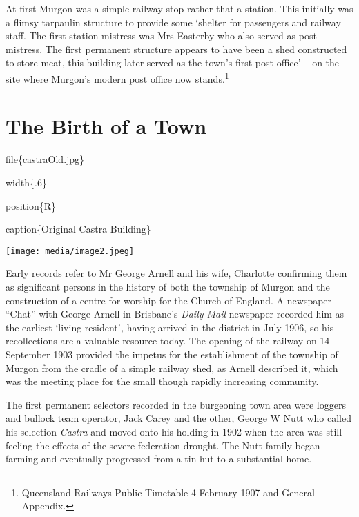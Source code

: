 At first Murgon was a simple railway stop rather that a station. This
initially was a flimsy tarpaulin structure to provide some `shelter for
passengers and railway staff. The first station mistress was Mrs
Easterby who also served as post mistress. The first permanent structure
appears to have been a shed constructed to store meat, this building
later served as the town's first post office' \emph{--} on the site
where Murgon's modern post office now stands.\footnote{Queensland
  Railways Public Timetable 4 February 1907 and General Appendix.}

\hypertarget{the-birth-of-a-town}{%
\chapter{The Birth of a Town}\label{the-birth-of-a-town}}

file\{castraOld.jpg\}

width\{.6\}

position\{R\}

caption\{Original Castra Building\}

\texttt{[image: media/image2.jpeg]}

Early records refer to Mr George Arnell and his wife, Charlotte
confirming them as significant persons in the history of both the
township of Murgon and the construction of a centre for worship for the
Church of England. A newspaper ``Chat'' with George Arnell in Brisbane's
\emph{Daily Mail} newspaper recorded him as the earliest `living
resident'\emph{,} having arrived in the district in July 1906, so his
recollections are a valuable resource today. The opening of the railway
on 14 September 1903 provided the impetus for the establishment of the
township of Murgon from the cradle of a simple railway shed, as Arnell
described it, which was the meeting place for the small though rapidly
increasing community.

The first permanent selectors recorded in the burgeoning town area were
loggers and bullock team operator, Jack Carey and the other, George W
Nutt who called his selection \emph{Castra} and moved onto his holding
in 1902 when the area was still feeling the effects of the severe
federation drought. The Nutt family began farming and eventually
progressed from a tin hut to a substantial home.

